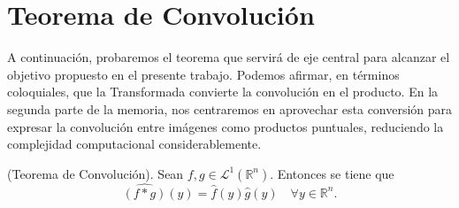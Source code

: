\section{Teorema de Convolución}
\noindent A continuación, probaremos el teorema que servirá de eje central para alcanzar el objetivo propuesto en el presente trabajo. Podemos afirmar, en términos coloquiales, que la Transformada convierte la convolución en el producto. En la segunda parte de la memoria, nos centraremos en aprovechar esta conversión para expresar la convolución entre imágenes como productos puntuales, reduciendo la complejidad computacional considerablemente.
\vspace{-0.07cm}
\begin{teorema} \label{teo}(Teorema de Convolución). Sean $f,g \in \mathscr{L}^1(\mathbb{R}^n)$. Entonces se tiene que 
\begin{equation}
    \widehat{(f*g)}(y) = \widehat{f}(y) \widehat{g}(y) \quad \forall y \in \mathbb{R}^n.
\end{equation}
    
\end{teorema}

